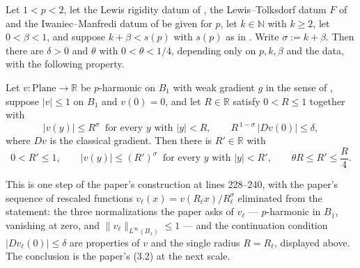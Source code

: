 \begin{lemma}
Let $1<p<2$, let the Lewis rigidity datum of , the Lewis--Tolksdorf
datum $F$ of  and the Iwaniec--Manfredi datum of
 be given for $p$, let $k\in\mathbb{N}$ with $k\ge2$, let
$0<\beta<1$, and suppose $k+\beta<s(p)$ with $s(p)$ as in .  Write
$\sigma:=k+\beta$.  Then there are $\delta>0$ and $\theta$ with $0<\theta<1/4$, depending only
on $p,k,\beta$ and the data, with the following property.

Let $v\colon\mathrm{Plane}\to\mathbb{R}$ be $p$-harmonic on $B_1$ with weak gradient $g$ in the
sense of , suppose $\lvert v\rvert\le1$ on $B_1$ and $v(0)=0$, and let
$R\in\mathbb{R}$ satisfy $0<R\le1$ together with
\[
  \lvert v(y)\rvert\le R^{\sigma}\ \text{ for every }y\text{ with }\lvert y\rvert<R,
  \qquad
  R^{\,1-\sigma}\,\lvert Dv(0)\rvert\le\delta ,
\]
where $Dv$ is the classical gradient.  Then there is $R'\in\mathbb{R}$ with
\[
  0<R'\le1,\qquad
  \lvert v(y)\rvert\le (R')^{\sigma}\ \text{ for every }y\text{ with }\lvert y\rvert<R',
  \qquad
  \theta R\le R'\le\frac{R}{4}.
\]

This is one step of the paper's construction at lines 228--240, with the paper's sequence of
rescaled functions $v_\ell(x)=v(R_\ell x)/R_\ell^{\sigma}$ eliminated from the statement: the
three normalizations the paper asks of $v_\ell$ --- $p$-harmonic in $B_1$, vanishing at zero,
and $\lVert v_\ell\rVert_{L^{\infty}(B_1)}\le1$ --- and the continuation condition
$\lvert Dv_\ell(0)\rvert\le\delta$ are properties of $v$ and the single radius $R=R_\ell$,
displayed above.  The conclusion is the paper's (3.2) at the next scale.
\end{lemma}
